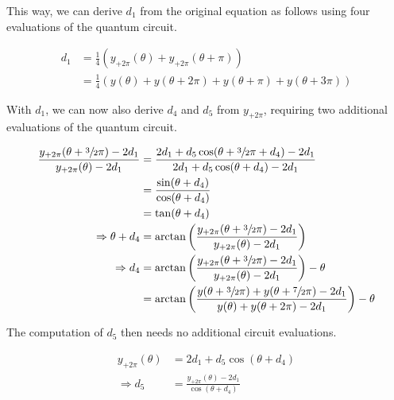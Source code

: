 This way, we can derive $d_1$ from the original equation as follows using four
evaluations of the quantum circuit.

\begin{equation}
    \label{eq:d1}
    \begin{split}
        d_1
            &= \frac14 (y_{+2\pi}(\theta) + y_{+2\pi}(\theta + \pi)) \\
            &= \frac14 (y(\theta) + y(\theta + 2\pi) + y(\theta + \pi) + y(\theta + 3\pi))
    \end{split}
\end{equation}

With $d_1$, we can now also derive $d_4$ and $d_5$ from $y_{+2\pi}$, requiring
two additional evaluations of the quantum circuit.

\begin{equation}
    \label{eq:d4}
    \begin{split}
        \frac{y_{+2\pi}(\theta + \sfrac32 \pi) - 2 d_1}{y_{+2\pi}(\theta) - 2 d_1}
            &= \frac{2 d_1 + d_5 \cos(\theta + \sfrac32 \pi + d_4) - 2 d_1}{2 d_1 + d_5 \cos(\theta + d_4) - 2 d_1} \\
            &= \frac{\sin(\theta + d_4)}{\cos(\theta + d_4)} \\
            &= \tan(\theta + d_4) \\
        \Rightarrow \theta + d_4
            &= \arctan\left(\frac{y_{+2\pi}(\theta + \sfrac32 \pi) - 2 d_1}{y_{+2\pi}(\theta) - 2 d_1}\right) \\
        \Rightarrow d_4
            &= \arctan\left(\frac{y_{+2\pi}(\theta + \sfrac32 \pi) - 2 d_1}{y_{+2\pi}(\theta) - 2 d_1}\right) - \theta \\
            &= \arctan\left(\frac{y(\theta + \sfrac32 \pi) + y(\theta + \sfrac72 \pi) - 2 d_1}{y(\theta) + y(\theta + 2\pi) - 2 d_1}\right) - \theta
    \end{split}
\end{equation}

The computation of $d_5$ then needs no additional circuit evaluations.

\begin{equation}
    \label{eq:d5}
    \begin{split}
        y_{+2\pi}(\theta) &= 2 d_1 + d_5 \cos(\theta + d_4) \\
        \Rightarrow d_5 &= \frac{y_{+2\pi}(\theta) - 2 d_1}{\cos(\theta + d_4)}
    \end{split}
\end{equation}

